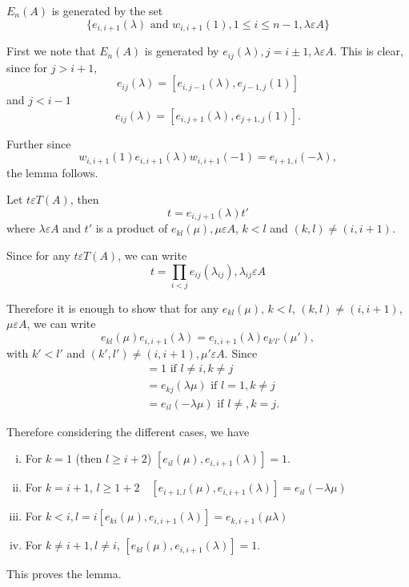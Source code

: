 \begin{lem}\label{c3:lem2.3}
$E_n(A)$ is generated by the set
$$
\{e_{i,i+1}(\lambda)\text{ and } w_{i,i+1}(1),1\leq i \leq n-1,
\lambda \varepsilon A\}
$$
\end{lem}

\begin{Proof}
First we note that $E_n(A)$ is generated by $e_{ij}(\lambda),j=i\pm 1,
\lambda \varepsilon A$. This is clear, since for $j>i+1$, 
$$
e_{ij}(\lambda)=[e_{i,j-1}(\lambda), e_{j-1,j}(1)]
$$
and $j<i-1$
$$
e_{ij}(\lambda)=[e_{i,j+1}(\lambda), e_{j+1,j}(1)].
$$

Further since
$$
w_{i,i+1}(1)e_{i,i+1}(\lambda)w_{i,i+1}(-1)=e_{i+1,i}(-\lambda),
$$
the lemma follows.
\enprf
\end{Proof}

\begin{lem}\label{c3:lem2.4}
Let $t\varepsilon T(A)$, then 
$$
t=e_{i,j+1}(\lambda)t'
$$
where $\lambda \varepsilon A$ and $t'$ is a product of
$e_{kl}(\mu),\mu \varepsilon A$, $k<l$ and $(k,l)\neq
(i,i+1)$. 
\end{lem}

\begin{Proof}
Since for any $t\varepsilon T(A)$, we can write 
$$
t=\prod\limits_{i<j}e_{ij}(\lambda_{ij}), \lambda_{ij}\varepsilon A
$$

Therefore it is enough to show that for any $e_{kl}(\mu)$,
$k<l$, $(k,l)\neq (i,i+1)$, $\mu \varepsilon A$, we can
write
$$
e_{kl}(\mu)e_{i,i+1}(\lambda)=e_{i,i+1}(\lambda)e_{k'l'}(\mu'),
$$
with $k'< l'$ and $(k',l') \neq (i,i+1),\mu'\varepsilon
A$. Since 
\begin{align*}
[e_{kl}(\mu),e_{ij}(\lambda)]&=1\text{ if } l \neq i, k\neq
j\\
&= e_{kj}(\lambda \mu)\text{ if } l=1, k\neq j\\
&=e_{il}(-\lambda \mu) \text{ if } l \neq, k=j.
\end{align*}

Therefore considering the different cases, we have
\begin{enumerate}[(i)]
\item For $k=1$ (then $l \geq i+2$) $[e_{il}(\mu),e_{i,i+1}(\lambda)]=1$.
\item For $k=i+1$, $l\geq 1+2\quad [e_{i+1,l}(\mu),
  e_{i,i+1}(\lambda)]=e_{il}(-\lambda \mu)$
\item For $k<i,l=i
  [e_{ki}(\mu),e_{i,i+1}(\lambda)]=e_{k,i+1}(\mu\lambda)$
\item For $k\neq i+1, l\neq i$, $[e_{kl}(\mu),e_{i,i+1}(\lambda)]=1$.
\end{enumerate}
This proves the lemma.
\enprf
\end{Proof}

